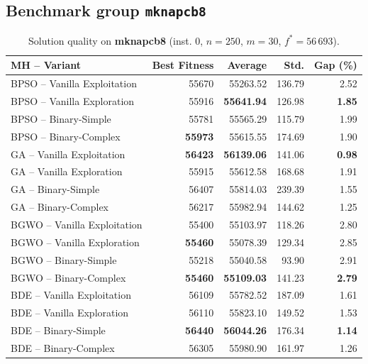 \documentclass[journal,article,submit,moreauthors]{Definitions/mdpi}
\begin{document}
\clearpage
\subsection{Benchmark group \texttt{mknapcb8}}

\begin{table}[htbp]
  \centering
  \small
  \caption{Solution quality on \textbf{mknapcb8} (inst. 0, $n=250$, $m=30$, $f^*=56\,693$).}
  \label{tab:calidad_mknapcb8_0}
  \begin{tabular}{lrrrr}
    \toprule
    \textbf{MH -- Variant} &
    \textbf{Best Fitness} &
    \textbf{Average} &
    \textbf{Std.} &
    \textbf{Gap (\%)} \\
    \midrule
    BPSO -- Vanilla Exploitation &          55670 &         55263.52 & 136.79 &         2.52 \\
    BPSO -- Vanilla Exploration  &          55916 & \textbf{55641.94} & 126.98 & \textbf{1.85} \\
    BPSO -- Binary-Simple        &          55781 &         55565.29 & 115.79 &         1.99 \\
    BPSO -- Binary-Complex       & \textbf{55973} &         55615.55 & 174.69 &         1.90 \\
    \midrule
    GA -- Vanilla Exploitation   & \textbf{56423} & \textbf{56139.06} & 141.06 & \textbf{0.98} \\
    GA -- Vanilla Exploration    &          55915 &         55612.58 & 168.68 &         1.91 \\
    GA -- Binary-Simple          &          56407 &         55814.03 & 239.39 &         1.55 \\
    GA -- Binary-Complex         &          56217 &         55982.94 & 144.62 &         1.25 \\
    \midrule
    BGWO -- Vanilla Exploitation &          55400 &         55103.97 & 118.26 &         2.80 \\
    BGWO -- Vanilla Exploration  & \textbf{55460} &         55078.39 & 129.34 &         2.85 \\
    BGWO -- Binary-Simple        &          55218 &         55040.58 &  93.90 &         2.91 \\
    BGWO -- Binary-Complex       & \textbf{55460} & \textbf{55109.03} & 141.23 & \textbf{2.79} \\
    \midrule
    BDE -- Vanilla Exploitation  &          56109 &         55782.52 & 187.09 &         1.61 \\
    BDE -- Vanilla Exploration   &          56110 &         55823.10 & 149.52 &         1.53 \\
    BDE -- Binary-Simple         & \textbf{56440} & \textbf{56044.26} & 176.34 & \textbf{1.14} \\
    BDE -- Binary-Complex        &          56305 &         55980.90 & 161.97 &         1.26 \\
    \bottomrule
  \end{tabular}
\end{table}
\end{document}

